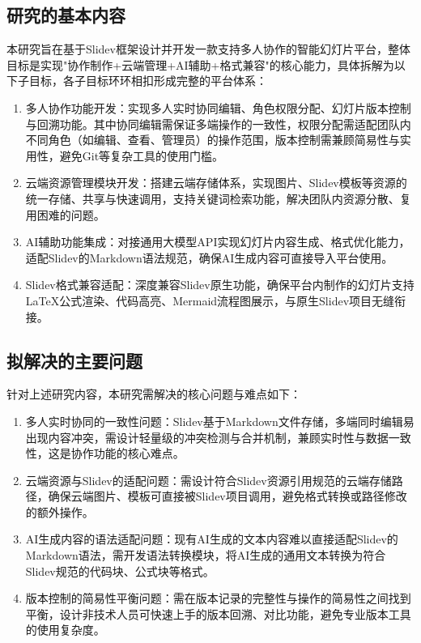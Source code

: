 \subsection{研究的基本内容}
本研究旨在基于Slidev框架设计并开发一款支持多人协作的智能幻灯片平台，整体目标是实现"协作制作+云端管理+AI辅助+格式兼容"的核心能力，具体拆解为以下子目标，各子目标环环相扣形成完整的平台体系：
\begin{enumerate}[label=(\arabic*)]
    \item 多人协作功能开发：实现多人实时协同编辑\cite{DNZS201028018}、角色权限分配\cite{wu2002rbacweb}、幻灯片版本控制与回溯功能。其中协同编辑需保证多端操作的一致性，权限分配需适配团队内不同角色（如编辑、查看、管理员）的操作范围，版本控制需兼顾简易性与实用性，避免Git等复杂工具的使用门槛。
    \item 云端资源管理模块开发：搭建云端存储体系，实现图片、Slidev模板等资源的统一存储、共享与快速调用，支持关键词检索功能，解决团队内资源分散、复用困难的问题。
    \item AI辅助功能集成：对接通用大模型API实现幻灯片内容生成、格式优化能力，适配Slidev的Markdown语法规范，确保AI生成内容可直接导入平台使用。
    \item Slidev格式兼容适配：深度兼容Slidev原生功能，确保平台内制作的幻灯片支持LaTeX公式渲染、代码高亮、Mermaid流程图展示，与原生Slidev项目无缝衔接\cite{GYKJ201303028}。
\end{enumerate}

\subsection{拟解决的主要问题}
针对上述研究内容，本研究需解决的核心问题与难点如下：
\begin{enumerate}[label=(\arabic*)]
    \item 多人实时协同的一致性问题：Slidev基于Markdown文件存储，多端同时编辑易出现内容冲突，需设计轻量级的冲突检测与合并机制，兼顾实时性与数据一致性，这是协作功能的核心难点。
    \item 云端资源与Slidev的适配问题：需设计符合Slidev资源引用规范的云端存储路径，确保云端图片、模板可直接被Slidev项目调用，避免格式转换或路径修改的额外操作。
    \item AI生成内容的语法适配问题：现有AI生成的文本内容难以直接适配Slidev的Markdown语法，需开发语法转换模块，将AI生成的通用文本转换为符合Slidev规范的代码块、公式块等格式。
    \item 版本控制的简易性平衡问题：需在版本记录的完整性与操作的简易性之间找到平衡，设计非技术人员可快速上手的版本回溯、对比功能，避免专业版本工具的使用复杂度。
\end{enumerate}

